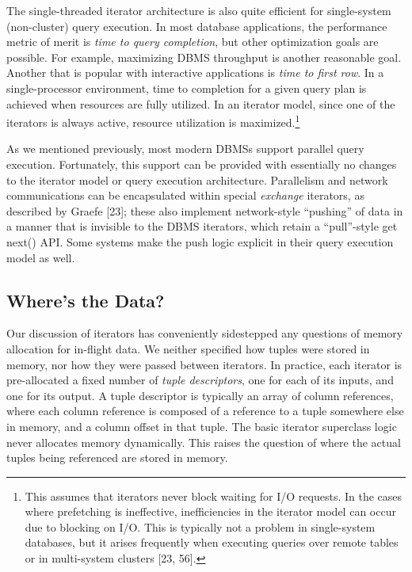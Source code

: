 \documentclass[b5paper,11pt,twoside,openright]{book}
\begin{document}
The single-threaded iterator architecture is also quite efficient for
single-system (non-cluster) query execution. In most database
applications, the performance metric of merit is \emph{time to query
completion}, but other optimization goals are possible. For example,
maximizing DBMS throughput is another reasonable goal. Another that is
popular with interactive applications is \emph{time to first row}. In a
single-processor environment, time to completion for a given query plan
is achieved when resources are fully utilized. In an iterator model,
since one of the iterators is always active, resource utilization is
maximized.\footnote{This assumes that iterators never block waiting for I/O requests. In
the cases where prefetching is ineffective, inefficiencies in the
iterator model can occur due to blocking on I/O. This is typically not
a problem in single-system databases, but it arises frequently when
executing queries over remote tables or in multi-system clusters
{[}23, 56{]}.}

As we mentioned previously, most modern DBMSs support parallel query
execution. Fortunately, this support can be provided with essentially no
changes to the iterator model or query execution architecture.
Parallelism and network communications can be encapsulated within
special \emph{exchange} iterators, as described by Graefe {[}23{]};
these also implement network-style ``pushing'' of data in a manner that
is invisible to the DBMS iterators, which retain a ``pull''-style get
next() API. Some systems make the push logic explicit in their query
execution model as well.

\hypertarget{wheres-the-data}{%
\subsection{Where's the Data?}\label{wheres-the-data}}

Our discussion of iterators has conveniently sidestepped any questions
of memory allocation for in-flight data. We neither specified how tuples
were stored in memory, nor how they were passed between iterators. In
practice, each iterator is pre-allocated a fixed number of \emph{tuple
descriptors}, one for each of its inputs, and one for its output. A
tuple descriptor is typically an array of column references, where each
column reference is composed of a reference to a tuple somewhere else in
memory, and a column offset in that tuple. The basic iterator superclass
logic never allocates memory dynamically. This raises the question of
where the actual tuples being referenced are stored in memory.
\end{document}
